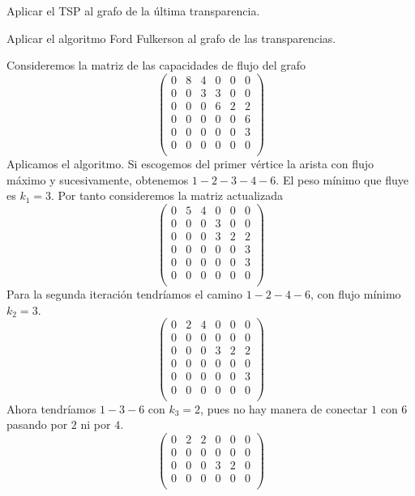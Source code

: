 \documentclass[twoside]{article}
\begin{document}
\begin{ejercicio}{2.7}
Aplicar el TSP al grafo de la última transparencia.
\end{ejercicio}
\newpage

\begin{ejercicio}{2.8} Aplicar el algoritmo Ford Fulkerson al grafo de las transparencias.
\end{ejercicio}
\begin{solucion}
Consideremos la matriz de las capacidades de flujo del grafo
$$
\begin{pmatrix}
0	&8	&4	&0	&0	&0\\
0	&0	&3	&3	&0	&0\\
0	&0	&0	&6	&2	&2\\
0	&0	&0	&0	&0	&6\\
0	&0	&0	&0	&0	&3\\
0	&0	&0	&0	&0	&0\\
\end{pmatrix}
$$
Aplicamos el algoritmo. Si escogemos del primer vértice la arista con flujo máximo y sucesivamente, obtenemos $1-2-3-4-6$. El peso mínimo que fluye es $k_1 = 3$. Por tanto consideremos la matriz actualizada
$$
\begin{pmatrix}
0	&5	&4	&0	&0	&0\\
0	&0	&0	&3	&0	&0\\
0	&0	&0	&3	&2	&2\\
0	&0	&0	&0	&0	&3\\
0	&0	&0	&0	&0	&3\\
0	&0	&0	&0	&0	&0\\
\end{pmatrix}
$$
Para la segunda iteración tendríamos el camino $1-2-4-6$, con flujo mínimo $k_2=3$.
$$
\begin{pmatrix}
0	&2	&4	&0	&0	&0\\
0	&0	&0	&0	&0	&0\\
0	&0	&0	&3	&2	&2\\
0	&0	&0	&0	&0	&0\\
0	&0	&0	&0	&0	&3\\
0	&0	&0	&0	&0	&0\\
\end{pmatrix}
$$
Ahora tendríamos $1-3-6$ con $k_3=2$, pues no hay manera de conectar $1$ con $6$ pasando por $2$ ni por $4$.
$$
\begin{pmatrix}
0	&2	&2	&0	&0	&0\\
0	&0	&0	&0	&0	&0\\
0	&0	&0	&3	&2	&0\\
0	&0	&0	&0	&0	&0\\

\end{pmatrix}$$
\end{solucion}
\end{document}
